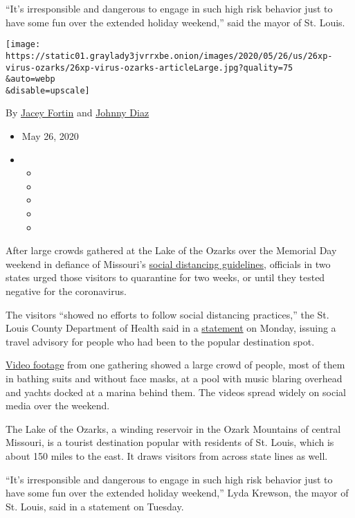 ``It's irresponsible and dangerous to engage in such high risk behavior
just to have some fun over the extended holiday weekend,'' said the
mayor of St. Louis.

\texttt{[image: https://static01.graylady3jvrrxbe.onion/images/2020/05/26/us/26xp-virus-ozarks/26xp-virus-ozarks-articleLarge.jpg?quality=75\\\&auto=webp\\\&disable=upscale]}

By \href{https://www.nytimes3xbfgragh.onion/by/jacey-fortin}{Jacey
Fortin} and
\href{https://www.nytimes3xbfgragh.onion/by/johnny-diaz}{Johnny Diaz}

\begin{itemize}
\item
  May 26, 2020
\item
  \begin{itemize}
  \item
  \item
  \item
  \item
  \item
  \end{itemize}
\end{itemize}

After large crowds gathered at the Lake of the Ozarks over the Memorial
Day weekend in defiance of Missouri's
\href{https://governor.mo.gov/sites/gov/files/media/pdf/2020/04/Economic-Reopening-Phase-1.pdf}{social
distancing guidelines}, officials in two states urged those visitors to
quarantine for two weeks, or until they tested negative for the
coronavirus.

The visitors ``showed no efforts to follow social distancing
practices,'' the St. Louis County Department of Health said in a
\href{https://stlcorona.com/news/press-release-5252020/}{statement} on
Monday, issuing a travel advisory for people who had been to the popular
destination spot.

\href{https://twitter.com/scottpasmoretv/status/1264394565861232640}{Video
footage} from one gathering showed a large crowd of people, most of them
in bathing suits and without face masks, at a pool with music blaring
overhead and yachts docked at a marina behind them. The videos spread
widely on social media over the weekend.

The Lake of the Ozarks, a winding reservoir in the Ozark Mountains of
central Missouri, is a tourist destination popular with residents of St.
Louis, which is about 150 miles to the east. It draws visitors from
across state lines as well.

``It's irresponsible and dangerous to engage in such high risk behavior
just to have some fun over the extended holiday weekend,'' Lyda Krewson,
the mayor of St. Louis, said in a statement on Tuesday.

